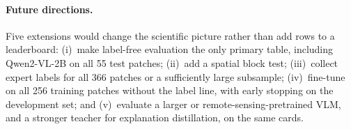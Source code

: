 \documentclass[11pt]{article}
\begin{document}
\paragraph{Future directions.} Five extensions would change the scientific picture rather than add
rows to a leaderboard: (i)~make label-free evaluation the only primary
table, including Qwen2-VL-2B on all 55 test patches; (ii)~add a spatial
block test; (iii)~collect expert labels for all 366 patches or a
sufficiently large subsample; (iv)~fine-tune on all 256 training
patches without the label line, with early stopping on the development
set; and (v)~evaluate a larger or remote-sensing-pretrained VLM, and a
stronger teacher for explanation distillation, on the same cards.



\end{document}
